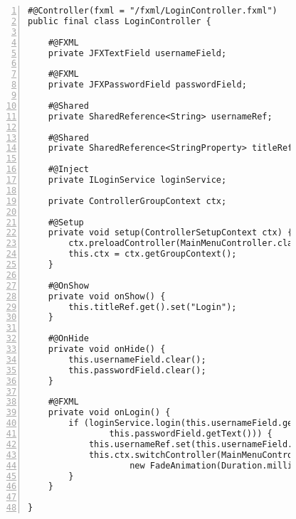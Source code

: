 \begin{figure}[H]
	\begin{lstlisting}[caption=Demo -- \texttt{LoginController}., captionpos=b, label=lst:login_controller, numbers=left, xleftmargin=1.7em, framexleftmargin=1.7em, nolol]
#@Controller(fxml = "/fxml/LoginController.fxml")
public final class LoginController {

	#@FXML
    private JFXTextField usernameField;

    #@FXML
    private JFXPasswordField passwordField;

    #@Shared
    private SharedReference<String> usernameRef;

    #@Shared
    private SharedReference<StringProperty> titleRef;

    #@Inject
    private ILoginService loginService;

    private ControllerGroupContext ctx;

    #@Setup
    private void setup(ControllerSetupContext ctx) {
        ctx.preloadController(MainMenuController.class);
        this.ctx = ctx.getGroupContext();
    }

    #@OnShow
    private void onShow() {
        this.titleRef.get().set("Login");
    }

    #@OnHide
    private void onHide() {
        this.usernameField.clear();
        this.passwordField.clear();
    }

    #@FXML
    private void onLogin() {
        if (loginService.login(this.usernameField.getText(),
				this.passwordField.getText())) {
            this.usernameRef.set(this.usernameField.getText());
            this.ctx.switchController(MainMenuController.class,
					new FadeAnimation(Duration.millis(250)));
        }
    }

}
	\end{lstlisting}
\end{figure}
